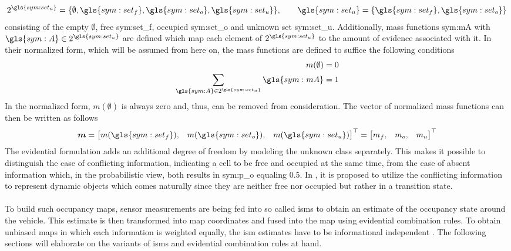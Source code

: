 \begin{align}
	2^{\gls{sym:set_u}} = \{\emptyset, \gls{sym:set_f}, \gls{sym:set_o}, \gls{sym:set_u}\}, \qquad \gls{sym:set_u} = \{\gls{sym:set_f}, \gls{sym:set_o}\}	
\end{align}
consisting of the empty $\emptyset$, free \gls{sym:set_f}, occupied \gls{sym:set_o} and unknown set \gls{sym:set_u}. Additionally, mass functions \gls{sym:mA} with $\gls{sym:A} \in 2^{\gls{sym:set_u}}$ are defined which map each element of $2^{\gls{sym:set_u}}$ to the amount of evidence associated with it. In their normalized form, which will be assumed from here on, the mass functions are defined to suffice the following conditions
\begin{align}
	\label{eq:evidential_norm}
	m(\emptyset) &= 0\\
	\sum_{\gls{sym:A} \in 2^{\gls{sym:set_u}}} \gls{sym:mA} &= 1
\end{align} 
In the normalized form, $m(\emptyset)$ is always zero and, thus, can be removed from consideration. The vector of normalized mass functions can then be written as follows
\begin{align}
	\vec{m} = \begin{bmatrix} m(\gls{sym:set_f}), & m(\gls{sym:set_o}), & m(\gls{sym:set_u}) \end{bmatrix}^{\top} = \begin{bmatrix} m_f, & m_o, & m_u \end{bmatrix}^{\top}
\end{align}
The evidential formulation adds an additional degree of freedom by modeling the unknown class separately. This makes it possible to distinguish the case of conflicting information, indicating a cell to be free and occupied at the same time, from the case of absent information which, in the probabilistic view, both results in \gls{sym:p_o} equaling 0.5. In \cite{moras2011moving,yu2015evidential,kurdej2012map}, it is proposed to utilize the conflicting information to represent dynamic objects which comes naturally since they are neither free nor occupied but rather in a transition state.
\\\\
To build such occupancy maps, sensor measurements are being fed into so called \gls{ism}s to obtain an estimate of the occupancy state around the vehicle. This estimate is then transformed into map coordinates and fused into the map using evidential combination rules. To obtain unbiased maps in which each information is weighted equally, the \gls{ism} estimates have to be informational independent \cite{pagac1996evidential}. The following sections will elaborate on the variants of \gls{ism}s and evidential combination rules at hand.
%
